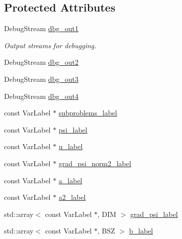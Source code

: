 \subsection*{Protected Attributes}
\begin{DoxyCompactItemize}
\item 
Debug\+Stream \hyperlink{classUintah_1_1PhaseField_1_1PureMetal_ab839d7f9525beb37d13201d4def284de}{dbg\+\_\+out1}
\begin{DoxyCompactList}\small\item\em Output streams for debugging. \end{DoxyCompactList}\item 
Debug\+Stream \hyperlink{classUintah_1_1PhaseField_1_1PureMetal_a82dab1cd7c6f1c2869cf9988b3bda3f9}{dbg\+\_\+out2}
\item 
Debug\+Stream \hyperlink{classUintah_1_1PhaseField_1_1PureMetal_ac1ad6cdf9b3e6b61bf1621b664c1db2a}{dbg\+\_\+out3}
\item 
Debug\+Stream \hyperlink{classUintah_1_1PhaseField_1_1PureMetal_a6b01123008a17f9b0f7824937eae55d0}{dbg\+\_\+out4}
\item 
const Var\+Label $\ast$ \hyperlink{classUintah_1_1PhaseField_1_1PureMetal_a87727a1df693e06d2b03c841cc231827}{subproblems\+\_\+label}
\item 
const Var\+Label $\ast$ \hyperlink{classUintah_1_1PhaseField_1_1PureMetal_a58c7327ed5dc1be030db14e120e22101}{psi\+\_\+label}
\item 
const Var\+Label $\ast$ \hyperlink{classUintah_1_1PhaseField_1_1PureMetal_a2d7b1d7d7789adcca611c53859855b2e}{u\+\_\+label}
\item 
const Var\+Label $\ast$ \hyperlink{classUintah_1_1PhaseField_1_1PureMetal_ae14f310fbd200ecd19c7179c6b272c9a}{grad\+\_\+psi\+\_\+norm2\+\_\+label}
\item 
const Var\+Label $\ast$ \hyperlink{classUintah_1_1PhaseField_1_1PureMetal_a52b41ebe58b64b6e0014c230c12e0516}{a\+\_\+label}
\item 
const Var\+Label $\ast$ \hyperlink{classUintah_1_1PhaseField_1_1PureMetal_a4224b6793e95a14f793c3213a9cbb99e}{a2\+\_\+label}
\item 
std\+::array$<$ const Var\+Label $\ast$, D\+IM $>$ \hyperlink{classUintah_1_1PhaseField_1_1PureMetal_abac00bbaac3024d05c8ff5173dee9ed6}{grad\+\_\+psi\+\_\+label}
\item 
std\+::array$<$ const Var\+Label $\ast$, B\+SZ $>$ \hyperlink{classUintah_1_1PhaseField_1_1PureMetal_a4255242060008658552fcf4aade85121}{b\+\_\+label}
\item 

\end{DoxyCompactItemize}
